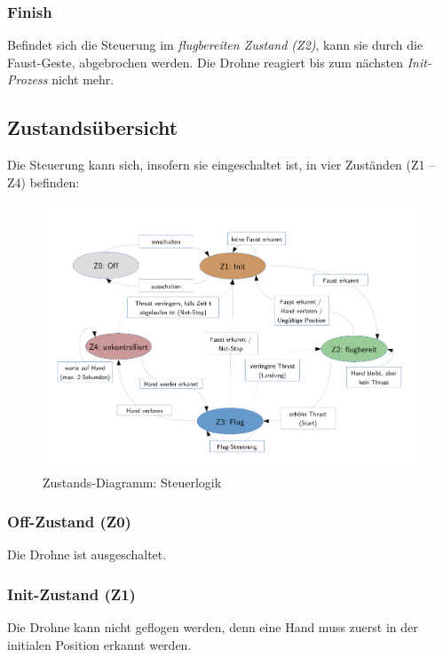 \subsubsection{Finish}
Befindet sich die Steuerung im \textit{flugbereiten Zustand (Z2)}, kann sie durch die Faust-Geste, abgebrochen werden.
Die Drohne reagiert bis zum nächsten \textit{Init-Prozess} nicht mehr.

\newpage
\subsection{Zustandsübersicht}
\label{sec:concept:stateoverview}
Die Steuerung kann sich, insofern sie eingeschaltet ist, in vier Zuständen (Z1 -- Z4) befinden:

\begin{figure}[H]
	\centering
	\includegraphics[width=1.0\textwidth]{figures/concept/state-diagram-1.pdf}
	\caption{Zustands-Diagramm: Steuerlogik}
\end{figure}

\subsubsection{Off-Zustand (Z0)}
Die Drohne ist ausgeschaltet.

\subsubsection{Init-Zustand (Z1)}
Die Drohne kann nicht geflogen werden, denn eine Hand muss zuerst in der initialen Position erkannt werden.

